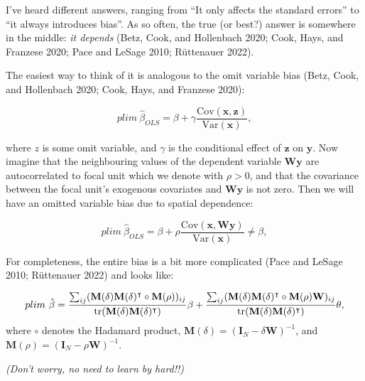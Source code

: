 \documentclass[
  letterpaper,
]{scrbook}
\begin{document}
I've heard different answers, ranging from ``It only affects the
standard errors'' to ``it always introduces bias''. As so often, the
true (or best?) answer is somewhere in the middle: \emph{it depends}
(Betz, Cook, and Hollenbach 2020; Cook, Hays, and Franzese 2020; Pace
and LeSage 2010; Rüttenauer 2022).

The easiest way to think of it is analogous to the omit variable bias
(Betz, Cook, and Hollenbach 2020; Cook, Hays, and Franzese 2020):

\[
plim~\hat{\beta}_{OLS}= \beta  + \gamma \frac{\mathrm{Cov}(\boldsymbol{\mathbf{x}}, \boldsymbol{\mathbf{z}})}{\mathrm{Var}(\boldsymbol{\mathbf{x}})},
\]

where \(z\) is some omit variable, and \(\gamma\) is the conditional
effect of \(\boldsymbol{\mathbf{z}}\) on \(\boldsymbol{\mathbf{y}}\).
Now imagine that the neighbouring values of the dependent variable
\(\boldsymbol{\mathbf{W}} \boldsymbol{\mathbf{y}}\) are autocorrelated
to focal unit which we denote with \(\rho > 0\), and that the covariance
between the focal unit's exogenous covariates and
\(\boldsymbol{\mathbf{W}} \boldsymbol{\mathbf{y}}\) is not zero. Then we
will have an omitted variable bias due to spatial dependence:

\[
plim~\hat{\beta}_{OLS}= \beta  + \rho \frac{\mathrm{Cov}(\boldsymbol{\mathbf{x}}, \boldsymbol{\mathbf{W}} \boldsymbol{\mathbf{y}})}{\mathrm{Var}(\boldsymbol{\mathbf{x}})} \neq \beta,
\]

For completeness, the entire bias is a bit more complicated (Pace and
LeSage 2010; Rüttenauer 2022) and looks like:

\[
plim~\hat{\beta}=\frac{\sum_{ij}({\boldsymbol{\mathbf{M}}}(\delta){\boldsymbol{\mathbf{M}}}(\delta)^\intercal\circ{\boldsymbol{\mathbf{M}}}(\rho))_{ij}}
{\mathrm{tr}({\boldsymbol{\mathbf{M}}}(\delta){\boldsymbol{\mathbf{M}}}(\delta)^\intercal)}\beta \\
+\frac{\sum_{ij}({\boldsymbol{\mathbf{M}}}(\delta){\boldsymbol{\mathbf{M}}}(\delta)^\intercal\circ{\boldsymbol{\mathbf{M}}}(\rho){\boldsymbol{\mathbf{W}}})_{ij}}
{\mathrm{tr}({\boldsymbol{\mathbf{M}}}(\delta){\boldsymbol{\mathbf{M}}}(\delta)^\intercal)}\theta,
\] where \(\circ\) denotes the Hadamard product,
\({\boldsymbol{\mathbf{M}}}(\delta)=({\boldsymbol{\mathbf{I}}}_N-\delta{\boldsymbol{\mathbf{W}}})^{-1}\),
and
\({\boldsymbol{\mathbf{M}}}(\rho)=({\boldsymbol{\mathbf{I}}}_N-\rho{\boldsymbol{\mathbf{W}}})^{-1}\).

\emph{(Don't worry, no need to learn by hard!!)}
\end{document}
